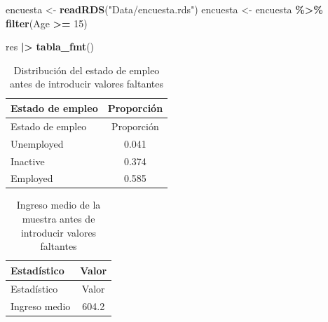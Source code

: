 \documentclass[
  spanish,
  12pt,
]{book}
\newenvironment{Shaded}{\begin{snugshade}}{\end{snugshade}}
\newcommand{\AttributeTok}[1]{\textcolor[rgb]{0.13,0.29,0.53}{#1}}
\newcommand{\ConstantTok}[1]{\textcolor[rgb]{0.56,0.35,0.01}{#1}}
\newcommand{\DecValTok}[1]{\textcolor[rgb]{0.00,0.00,0.81}{#1}}
\newcommand{\FunctionTok}[1]{\textcolor[rgb]{0.13,0.29,0.53}{\textbf{#1}}}
\newcommand{\NormalTok}[1]{#1}
\newcommand{\OtherTok}[1]{\textcolor[rgb]{0.56,0.35,0.01}{#1}}
\newcommand{\SpecialCharTok}[1]{\textcolor[rgb]{0.81,0.36,0.00}{\textbf{#1}}}
\newcommand{\StringTok}[1]{\textcolor[rgb]{0.31,0.60,0.02}{#1}}
\begin{document}
\begin{Shaded}
\begin{Highlighting}[]
\NormalTok{encuesta }\OtherTok{\textless{}{-}} \FunctionTok{readRDS}\NormalTok{(}\StringTok{"Data/encuesta.rds"}\NormalTok{)}
\NormalTok{encuesta  }\OtherTok{\textless{}{-}}\NormalTok{ encuesta }\SpecialCharTok{\%\textgreater{}\%} \FunctionTok{filter}\NormalTok{(Age }\SpecialCharTok{\textgreater{}=} \DecValTok{15}\NormalTok{)}
\end{Highlighting}
\end{Shaded}

\begin{Shaded}
\begin{Highlighting}[]
\NormalTok{res }\SpecialCharTok{|\textgreater{}}  \FunctionTok{tabla\_fmt}\NormalTok{()}
\end{Highlighting}
\end{Shaded}

\begin{longtable}[]{@{}lc@{}}
\caption{\label{tab:tab-prop-empleo-antes}Distribución del estado de empleo antes de introducir valores faltantes}\tabularnewline
\toprule\noalign{}
Estado de empleo & Proporción \\
\midrule\noalign{}
\endfirsthead
\toprule\noalign{}
Estado de empleo & Proporción \\
\midrule\noalign{}
\endhead
\bottomrule\noalign{}
\endlastfoot
Unemployed & 0.041 \\
Inactive & 0.374 \\
Employed & 0.585 \\
\end{longtable}

\begin{Shaded}
\end{Shaded}

\begin{longtable}[]{@{}lc@{}}
\caption{\label{tab:tab-ingreso-medio-antes}Ingreso medio de la muestra antes de introducir valores faltantes}\tabularnewline
\toprule\noalign{}
Estadístico & Valor \\
\midrule\noalign{}
\endfirsthead
\toprule\noalign{}
Estadístico & Valor \\
\midrule\noalign{}
\endhead
\bottomrule\noalign{}
\endlastfoot
Ingreso medio & 604.2 \\
\end{longtable}
\end{document}
